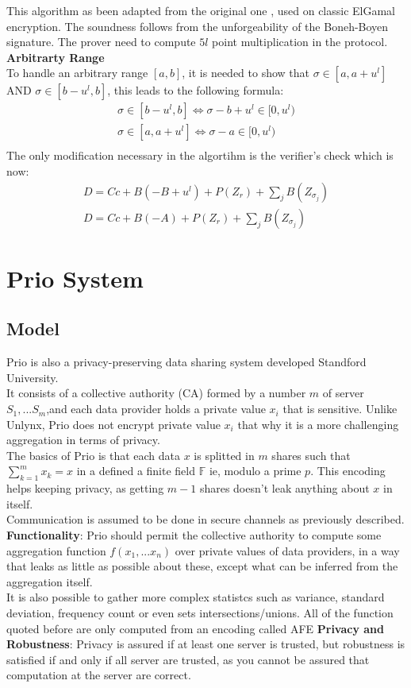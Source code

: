 \documentclass{article}
\begin{document}
This algorithm as been adapted from the original one \cite{range}, used on classic ElGamal encryption. The soundness follows from the unforgeability of the Boneh-Boyen signature. The prover need to compute $5l$ point multiplication in the protocol.\\
\textbf{Arbitrarty Range}\\
To handle an arbitrary range $[a,b]$, it is needed to show that $\sigma \in [a,a+u^l]$ AND $ \sigma \in [b-u^l,b]$, this leads to the following formula:\\
\begin{gather*}
 \sigma \in [b-u^l,b] \Longleftrightarrow   \sigma - b + u^l \in [0,u^l) \\
\sigma \in [a,a+u^l] \Longleftrightarrow   \sigma - a  \in [0,u^l)\\
\end{gather*}
The only modification necessary in the algortihm is the verifier's check which is now:
\begin{gather*}
D = Cc+B(-B+u^l)+P(Z_r)+\sum_j{B(Z_{\sigma_j})}\\
D= Cc+B(-A)+P(Z_r)+\sum_j{B(Z_{\sigma_j})}
\end{gather*}

\section{Prio System}
\subsection{Model}
Prio \cite{prio}  is also a privacy-preserving data sharing system developed Standford University.\\
It consists of a collective authority (CA) formed by a number $m$ of server $S_1,...S_m$,and each data provider holds a private value $x_i$ that is sensitive. 
Unlike Unlynx, Prio does not encrypt private value $x_i$ that why it is a more challenging aggregation in terms of privacy.\\
The basics of Prio is that each data $x$ is splitted in $m$ shares such that $\sum^m_{k=1}{x_k} = x $ in a defined a finite field $\mathbb{F}$ ie, modulo a prime $p$. This encoding helps keeping privacy, as getting $m-1$ shares doesn't leak anything about $x$ in itself.\\
Communication is assumed to be done in secure channels as previously described.\\
\textbf{Functionality}: Prio should permit the collective authority to compute some aggregation function $f(x_1,...x_n)$ over private values of data providers, in a way that leaks as little as possible about these, except what can be inferred from the aggregation itself.\\
It is also possible to gather more complex statistcs such as variance, standard deviation, frequency count or even sets intersections/unions. All of the function quoted before are only computed from an encoding called AFE
\textbf{Privacy and Robustness}: Privacy is assured if at least one server is trusted, but robustness is satisfied if and only if all server are trusted, as you cannot be assured that computation at the server are correct.
\end{document}
